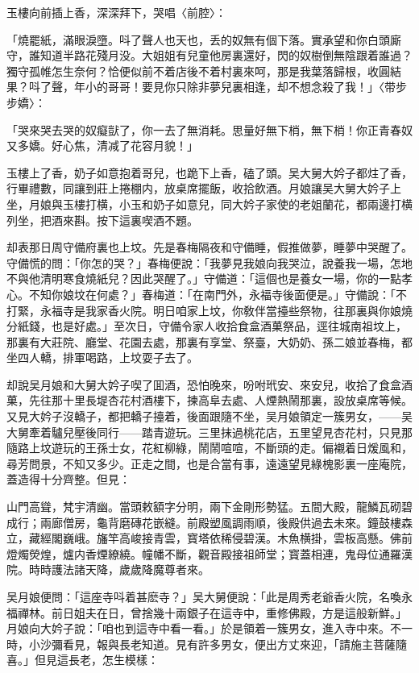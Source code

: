 玉樓向前插上香，深深拜下，哭唱〈前腔〉：

「燒罷紙，滿眼淚墮。呌了聲人也天也，丢的奴無有個下落。實承望和你白頭廝守，誰知道半路花殘月没。大姐姐有兒童他房裏還好，閃的奴樹倒無陰跟着誰過？獨守孤帷怎生奈何？恰便似前不着店後不着村裏來呵，那是我葉落歸根，收圓結果？呌了聲，年小的哥哥！要見你只除非夢兒裏相逢，却不想念殺了我！」〈带步步嬌〉：

「哭來哭去哭的奴癡獃了，你一去了無消耗。思量好無下梢，無下梢！你正青春奴又多嬌。好心焦，清减了花容月貌！」

玉樓上了香，奶子如意抱着哥兒，也跪下上香，磕了頭。吴大舅大妗子都炷了香，行畢禮數，同讓到莊上捲棚内，放桌席擺飯，收拾飲酒。月娘讓吴大舅大妗子上坐，月娘與玉樓打横，小玉和奶子如意兒，同大妗子家使的老姐蘭花，都兩邊打横列坐，把酒來斟。按下這裏喫酒不題。

却表那日周守備府裏也上坟。先是春梅隔夜和守備睡，假推做夢，睡夢中哭醒了。守備慌的問：「你怎的哭？」春梅便說：「我夢見我娘向我哭泣，說養我一場，怎地不與他清明寒食燒紙兒？因此哭醒了。」守備道：「這個也是養女一場，你的一點孝心。不知你娘坟在何處？」春梅道：「在南門外，永福寺後面便是。」守備說：「不打緊，永福寺是我家香火院。明日咱家上坟，你敎伴當擡些祭物，往那裏與你娘燒分紙錢，也是好處。」至次日，守備令家人收拾食盒酒菓祭品，逕往城南祖坟上，那裏有大莊院、廳堂、花園去處，那裏有享堂、祭臺，大奶奶、孫二娘並春梅，都坐四人轎，排軍喝路，上坟耍子去了。

却說吴月娘和大舅大妗子喫了囬酒，恐怕晚來，吩咐玳安、來安兒，收拾了食盒酒菓，先往那十里長堤杏花村酒樓下，揀高阜去處、人煙熱鬧那裏，設放桌席等候。又見大妗子沒轎子，都把轎子擡着，後面跟隨不坐，吴月娘領定一簇男女，——吴大舅牽着驢兒壓後同行——踏青遊玩。三里抹過桃花店，五里望見杏花村，只見那隨路上坟遊玩的王孫士女，花紅柳綠，鬧鬧喧喧，不斷頭的走。偏襯着日煖風和，尋芳問景，不知又多少。正走之間，也是合當有事，遠遠望見綠槐影裏一座庵院，蓋造得十分齊整。但見：

山門高聳，梵宇清幽。當頭敕額字分明，兩下金剛形勢猛。五間大殿，龍鱗瓦砌碧成行；兩廊僧房，龜背磨磚花嵌縫。前殿塑風調雨順，後殿供過去未來。鐘鼓樓森立，藏經閣巍峨。旛竿高峻接青雲，寳塔依稀侵碧漢。木魚横掛，雲板高懸。佛前燈燭熒煌，爐内香煙繚繞。幢幡不斷，觀音殿接祖師堂；寳蓋相連，鬼母位通羅漢院。時時護法諸天降，歲歲降魔尊者來。

吴月娘便問：「這座寺呌着甚麽寺？」吴大舅便說：「此是周秀老爺香火院，名喚永福禪林。前日姐夫在日，曾捨幾十兩銀子在這寺中，重修佛殿，方是這般新鮮。」月娘向大妗子說：「咱也到這寺中看一看。」於是領着一簇男女，進入寺中來。不一時，小沙彌看見，報與長老知道。見有許多男女，便出方丈來迎，「請施主菩薩隨喜。」但見這長老，怎生模樣：

